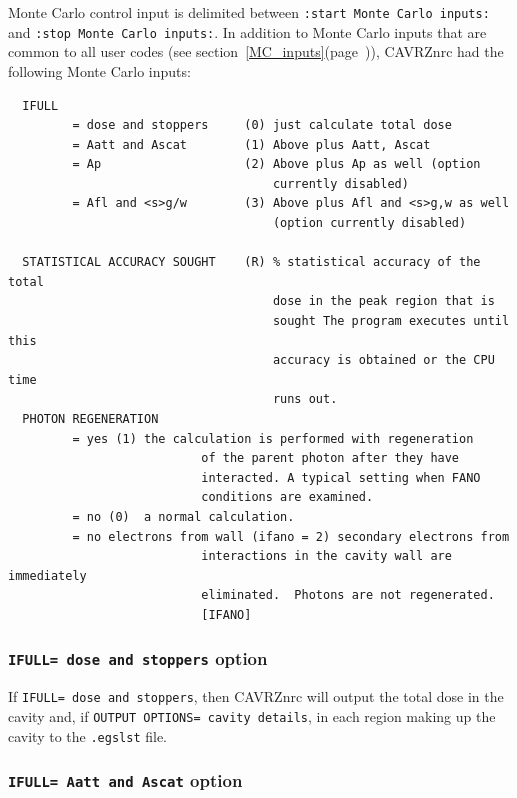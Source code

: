 \documentclass[12pt,twoside]{article}  %
\newcommand{\lpage}[1]{(page~\pageref{#1})}
\begin{document}
Monte Carlo control input is delimited between
\verb+:start Monte Carlo inputs:+\\
and \verb+:stop Monte Carlo inputs:+.  In addition to Monte Carlo inputs that 
are common to all user codes (see
section~\ref{MC_inputs}\lpage{MC_inputs}), CAVRZnrc had the following
Monte Carlo inputs:
\begin{verbatim}
  IFULL
         = dose and stoppers     (0) just calculate total dose
         = Aatt and Ascat        (1) Above plus Aatt, Ascat
         = Ap                    (2) Above plus Ap as well (option 
                                     currently disabled)
         = Afl and <s>g/w        (3) Above plus Afl and <s>g,w as well
                                     (option currently disabled)

  STATISTICAL ACCURACY SOUGHT    (R) % statistical accuracy of the total
                                     dose in the peak region that is 
                                     sought The program executes until this
                                     accuracy is obtained or the CPU time
                                     runs out.           
  PHOTON REGENERATION
         = yes (1) the calculation is performed with regeneration
                           of the parent photon after they have 
                           interacted. A typical setting when FANO 
                           conditions are examined.
         = no (0)  a normal calculation.
         = no electrons from wall (ifano = 2) secondary electrons from
                           interactions in the cavity wall are immediately
                           eliminated.  Photons are not regenerated.            
                           [IFANO]
\end{verbatim}

\subsubsection{{\tt IFULL= dose and stoppers} option}
\label{cavrzifullsect1}

If {\tt IFULL= dose and stoppers}, then CAVRZnrc will output the total
dose in the cavity and, if {\tt OUTPUT OPTIONS= cavity details},
in each region making up the cavity to the {\tt .egslst} file.

\subsubsection{{\tt IFULL= Aatt and Ascat} option}
\label{cavrzifullsect2}
\end{document}
